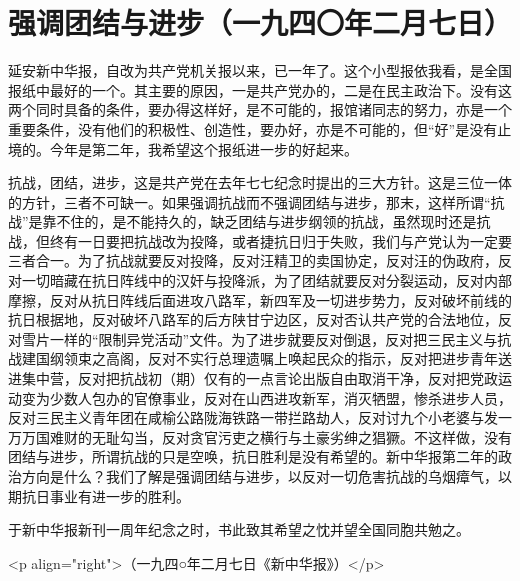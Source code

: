 \section[强调团结与进步（一九四〇年二月七日）]{强调团结与进步（一九四〇年二月七日）}


延安新中华报，自改为共产党机关报以来，已一年了。这个小型报依我看，是全国报纸中最好的一个。其主要的原因，一是共产党办的，二是在民主政治下。没有这两个同时具备的条件，要办得这样好，是不可能的，报馆诸同志的努力，亦是一个重要条件，没有他们的积极性、创造性，要办好，亦是不可能的，但“好”是没有止境的。今年是第二年，我希望这个报纸进一步的好起来。

抗战，团结，进步，这是共产党在去年七七纪念时提出的三大方针。这是三位一体的方针，三者不可缺一。如果强调抗战而不强调团结与进步，那末，这样所谓“抗战”是靠不住的，是不能持久的，缺乏团结与进步纲领的抗战，虽然现时还是抗战，但终有一日要把抗战改为投降，或者捷抗日归于失败，我们与产党认为一定要三者合一。为了抗战就要反对投降，反对汪精卫的卖国协定，反对汪的伪政府，反对一切暗藏在抗日阵线中的汉奸与投降派，为了团结就要反对分裂运动，反对内部摩擦，反对从抗日阵线后面进攻八路军，新四军及一切进步势力，反对破坏前线的抗日根据地，反对破坏八路军的后方陕甘宁边区，反对否认共产党的合法地位，反对雪片一样的“限制异党活动”文件。为了进步就要反对倒退，反对把三民主义与抗战建国纲领束之高阁，反对不实行总理遗嘱上唤起民众的指示，反对把进步青年送进集中营，反对把抗战初（期）仅有的一点言论出版自由取消干净，反对把党政运动变为少数人包办的官僚事业，反对在山西进攻新军，消灭牺盟，惨杀进步人员，反对三民主义青年团在咸榆公路陇海铁路一带拦路劫人，反对讨九个小老婆与发一万万国难财的无耻勾当，反对贪官污吏之横行与土豪劣绅之猖獗。不这样做，没有团结与进步，所谓抗战的只是空唤，抗日胜利是没有希望的。新中华报第二年的政治方向是什么？我们了解是强调团结与进步，以反对一切危害抗战的乌烟瘴气，以期抗日事业有进一步的胜利。

于新中华报新刊一周年纪念之时，书此致其希望之忱并望全国同胞共勉之。


<p align="right">（一九四○年二月七日《新中华报》）</p>

